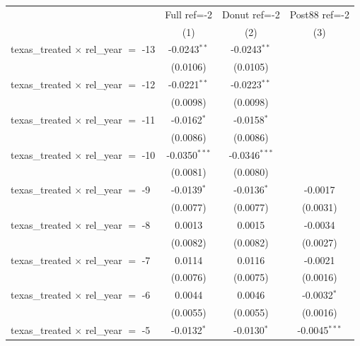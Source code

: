 
\begingroup
\centering
\begin{tabular}{lccc}
   \toprule
                                                & Full ref=-2     & Donut ref=-2    & Post88 ref=-2 \\   
                                                & (1)             & (2)             & (3)\\  
   \midrule 
   texas\_treated $\times$ rel\_year $=$ -13    & -0.0243$^{**}$  & -0.0243$^{**}$  &   \\   
                                                & (0.0106)        & (0.0105)        &   \\   
   texas\_treated $\times$ rel\_year $=$ -12    & -0.0221$^{**}$  & -0.0223$^{**}$  &   \\   
                                                & (0.0098)        & (0.0098)        &   \\   
   texas\_treated $\times$ rel\_year $=$ -11    & -0.0162$^{*}$   & -0.0158$^{*}$   &   \\   
                                                & (0.0086)        & (0.0086)        &   \\   
   texas\_treated $\times$ rel\_year $=$ -10    & -0.0350$^{***}$ & -0.0346$^{***}$ &   \\   
                                                & (0.0081)        & (0.0080)        &   \\   
   texas\_treated $\times$ rel\_year $=$ -9     & -0.0139$^{*}$   & -0.0136$^{*}$   & -0.0017\\   
                                                & (0.0077)        & (0.0077)        & (0.0031)\\   
   texas\_treated $\times$ rel\_year $=$ -8     & 0.0013          & 0.0015          & -0.0034\\   
                                                & (0.0082)        & (0.0082)        & (0.0027)\\   
   texas\_treated $\times$ rel\_year $=$ -7     & 0.0114          & 0.0116          & -0.0021\\   
                                                & (0.0076)        & (0.0075)        & (0.0016)\\   
   texas\_treated $\times$ rel\_year $=$ -6     & 0.0044          & 0.0046          & -0.0032$^{*}$\\   
                                                & (0.0055)        & (0.0055)        & (0.0016)\\   
   texas\_treated $\times$ rel\_year $=$ -5     & -0.0132$^{*}$   & -0.0130$^{*}$   & -0.0045$^{***}$\\   

\end{tabular}
